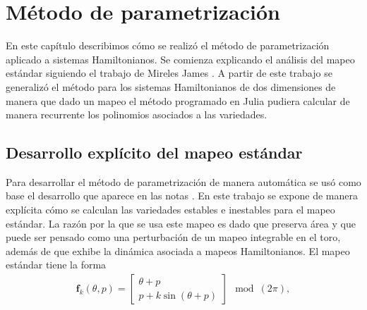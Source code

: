 
\chapter{Método de parametrización}
En este capítulo describimos cómo se realizó el método de parametrización aplicado a sistemas Hamiltonianos. Se comienza explicando el análisis del mapeo estándar siguiendo el trabajo de Mireles James \cite{Mireles}. A partir de este trabajo se generalizó el método para los sistemas Hamiltonianos de dos dimensiones de manera que dado un mapeo el método programado en Julia pudiera calcular de manera recurrente los polinomios asociados a las variedades.
\section{Desarrollo explícito del mapeo estándar}
Para desarrollar el método de parametrización de manera automática se usó como base el desarrollo que aparece en las notas \cite{Mireles}. En este trabajo se expone de manera explícita cómo se calculan las variedades estables e inestables para el mapeo estándar. La razón por la que se usa este mapeo es dado que preserva área y que puede ser pensado como una perturbación de un mapeo integrable en el toro, además de que exhibe la dinámica asociada a mapeos Hamiltonianos. El mapeo estándar tiene la forma\\
\begin{eqnarray}
\mathbf{f}_{k}(\theta,p) = \left[\begin{array}{c}
\theta + p \\
p + k\sin(\theta +p)
\end{array}\right] \mod(2\pi),  \label{mapeo estandar}
\end{eqnarray}

